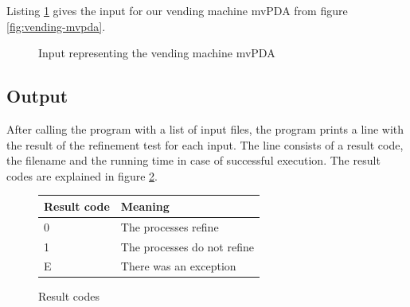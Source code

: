\begin{example}
Listing \ref{listing:mprs-input} gives the
input for our vending machine mvPDA from figure \ref{fig:vending-mvpda}.
\end{example}

\begin{figure}[ht]

\caption{Input representing the vending machine mvPDA}
\label{listing:mprs-input}
\end{figure}





\subsection{Output}

After calling the program with a list of input files, the program prints
a line with the result of the refinement test for each input.
The line consists of a result code, the filename and the running time
in case of successful execution. The result codes are explained in
figure \ref{fig:result-codes}.

\begin{figure}[ht]
  \centering
  \begin{tabular}{l|l}
    Result code & Meaning \\
    \hline
    {0} & The processes refine \\
    {1} & The processes do not refine  \\
    {E} & There was an exception
  \end{tabular}
  \caption{Result codes}
  \label{fig:result-codes}
\end{figure}

